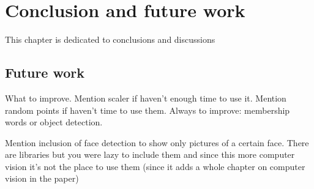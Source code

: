 \chapter{Conclusion and future work}
\label{chap:conclusion}

This chapter is dedicated to conclusions and discussions

\section{Future work}
\label{sec:conclusion_future}

What to improve. Mention scaler if haven't enough time to use it. Mention random points if haven't time to use them. Always to improve: membership words or object detection. 

Mention inclusion of face detection to show only pictures of a certain face. There are libraries but you were lazy to include them and since this more computer vision it's not the place to use them (since it adds a whole chapter on computer vision in the paper)